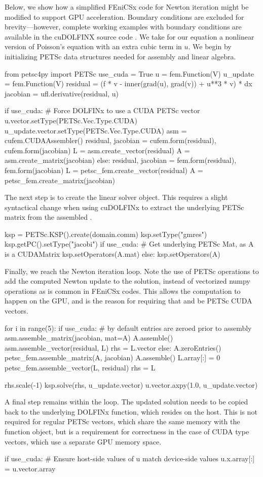 Below, we show how a simplified FEniCSx code for Newton iteration might be modified to support GPU acceleration. Boundary conditions are excluded for brevity---however, complete working examples with boundary conditions are available in the cuDOLFINX source code \citep{cudolfinxzenodo}. We take for our equation a nonlinear version of Poisson's equation with an extra cubic term in $u$. We begin by initializing PETSc data structures needed for assembly and linear algebra.
\begin{python}
from petsc4py import PETSc
use_cuda = True
u = fem.Function(V)
u_update = fem.Function(V)
residual = (f * v - inner(grad(u), grad(v)) + u**3 * v) * dx
jacobian = ufl.derivative(residual, u)

if use_cuda:
  # Force DOLFINx to use a CUDA PETSc vector
  u.vector.setType(PETSc.Vec.Type.CUDA)
  u_update.vector.setType(PETSc.Vec.Type.CUDA)
  asm = cufem.CUDAAssembler()
  residual, jacobian = cufem.form(residual), cufem.form(jacobian)
  L = asm.create_vector(residual)
  A = asm.create_matrix(jacobian)
else:
  residual, jacobian = fem.form(residual), fem.form(jacobian)
  L = petsc_fem.create_vector(residual)
  A = petsc_fem.create_matrix(jacobian)
\end{python}
The next step is to create the linear solver object. This requires a slight syntactical change when using cuDOLFINx to extract the underlying PETSc matrix from the assembled .
\begin{python}
ksp = PETSc.KSP().create(domain.comm)
ksp.setType("gmres")
ksp.getPC().setType("jacobi")
if use_cuda:
  # Get underlying PETSc Mat, as A is a CUDAMatrix
  ksp.setOperators(A.mat)
else:
  ksp.setOperators(A)
\end{python}
Finally, we reach the Newton iteration loop. Note the use of PETSc operations to add the computed Newton update to the solution, instead of vectorized numpy operations as is common in FEniCSx codes. This allows the computation to happen on the GPU, and is the reason for requiring that  and  be PETSc CUDA vectors.
\begin{python}
for i in range(5):
  if use_cuda:
    # by default entries are zeroed prior to assembly
    asm.assemble_matrix(jacobian, mat=A)
    A.assemble()
    asm.assemble_vector(residual, L)
    rhs = L.vector
  else:
    A.zeroEntries()
    petsc_fem.assemble_matrix(A, jacobian)
    A.assemble()
    L.array[:] = 0
    petsc_fem.assemble_vector(L, residual)
    rhs = L

  rhs.scale(-1)
  ksp.solve(rhs, u_update.vector)
  u.vector.axpy(1.0, u_update.vector)
\end{python}
A final step remains within the loop. The updated solution needs to be copied back to the underlying DOLFINx function, which resides on the host. This is not required for regular PETSc vectors, which share the same memory with the function object, but is a requirement for correctness in the case of CUDA type vectors, which use a separate GPU memory space.
\begin{python}
  if use_cuda:
    # Ensure host-side values of u match device-side values
    u.x.array[:] = u.vector.array
\end{python}

